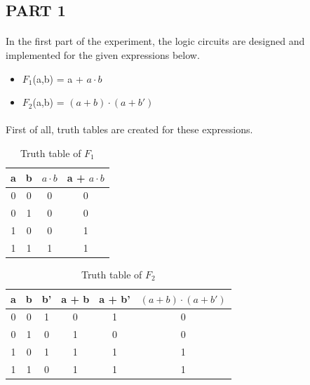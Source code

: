 \documentclass[pdftex,12pt,a4paper]{article}
\begin{document}
\begin{flushleft}
\subsection{PART 1}

\paragraph{}
In the first part of the experiment, the logic circuits are designed and implemented for the given expressions below.

\begin{itemize}
    \item $F_{1}$(a,b) = a + $a \cdot b$
    \item $F_{2}$(a,b) = $(a + b) \cdot (a + b')$
\end{itemize}

\paragraph{}
First of all, truth tables are created for these expressions.


\begin{table}[h]
    \centering
    \begin{tabular}{|c|c|c|c|}
    \hline
    a & b & $a \cdot b$ & a + $a \cdot b$ \\ \hline
    0 & 0 & 0     & 0         \\
    0 & 1 & 0     & 0         \\
    1 & 0 & 0     & 1         \\
    1 & 1 & 1     & 1         \\ \hline
    \end{tabular}
    \caption{Truth table of $F_1$}
    \label{fig1}
\end{table}

\newpage

\begin{table}[!h]
    \centering
    \begin{tabular}{|c|c|c|c|c|c|}
    \hline
    a & b & b' & a + b & a + b' & $(a + b) \cdot (a + b')$ \\ \hline
    0 & 0 & 1  & 0     & 1      & 0                  \\
    0 & 1 & 0  & 1     & 0      & 0                  \\
    1 & 0 & 1  & 1     & 1      & 1                  \\
    1 & 1 & 0  & 1     & 1      & 1                  \\ \hline
    \end{tabular}
    \caption{Truth table of $F_2$}
    \label{fig2}
\end{table}




\end{flushleft}
\end{document}
